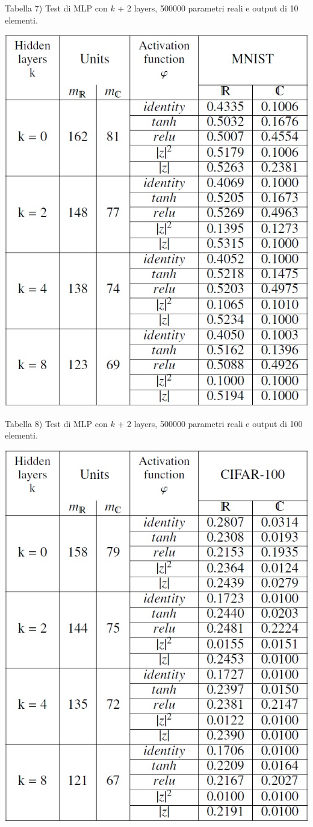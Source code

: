 \documentclass[a4paper,10pt]{article}
\begin{document}
Tabella 7) Test di MLP con $k$ + 2 layers, 500000 parametri reali e output di 10 elementi.

\includegraphics[width=%
\textwidth]{tabella8}


Tabella 8) Test di MLP con $k$ + 2 layers, 500000 parametri reali e output di 100 elementi.

\includegraphics[width=%
\textwidth]{tabella9}
 
\end{document}
